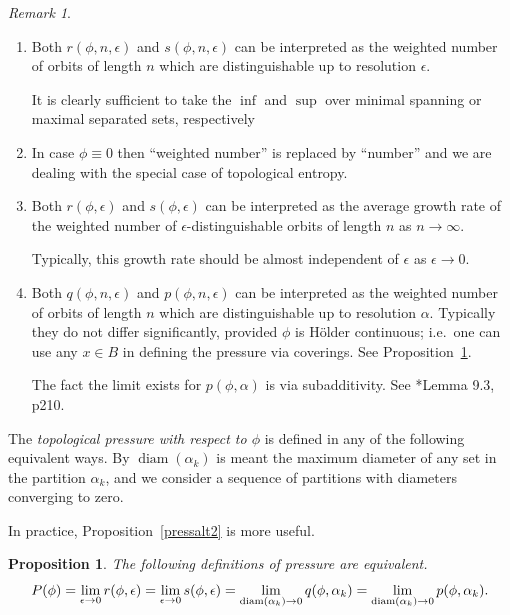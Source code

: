 \documentclass[a4paper]{amsart}
\theoremstyle{plain}
\newtheorem{proposition}[theorem]{Proposition}
\theoremstyle{definition}
\theoremstyle{remark}
\newtheorem{remark}[theorem]{Remark}
\DeclareMathOperator{\diam}{diam}
\begin{document}
\begin{remark}
\mbox{}
\begin{enumerate}

\item Both $ r(\phi, n , \epsilon ) $ and $ s(\phi, n , \epsilon ) $ can be interpreted as  the weighted number of orbits of length $ n $ which are distinguishable up to resolution $ \epsilon$.


It is clearly sufficient to take the $ \inf $ and $ \sup $ over minimal spanning or maximal separated sets, respectively

\item In case $ \phi \equiv 0 $ then ``weighted number'' is replaced by ``number'' and we are dealing with the special case of topological entropy. 

\item Both $ r(\phi,   \epsilon ) $ and $ s(\phi,   \epsilon ) $ can be interpreted as  the average growth rate of the
weighted number of $ \epsilon $-distinguishable orbits of length $ n $ as $ n\to \infty $.

Typically, this growth rate should be almost independent of $ \epsilon $ as $ \epsilon \to 0 $.

\item Both $ q(\phi, n , \epsilon ) $ and $ p(\phi, n , \epsilon ) $ can be interpreted as  the weighted number of orbits of length $ n $ which are distinguishable up to resolution $ \alpha $.  Typically they do not differ significantly, provided $ \phi $ is H\"{o}lder continuous; i.e.\ one can use any $ x\in B $ in defining the pressure via coverings.  See Proposition~\ref{pressalt}.

The fact the limit exists for $ p(\phi,\alpha) $ is via subadditivity.  See \cite{Wal}*{Lemma 9.3, p210}. 
\end{enumerate} 
 \end{remark}  
 
 The  \emph{topological pressure with respect to $ \phi $} is defined in any of the following equivalent ways.  By $ \diam(\alpha_k) $ is meant the maximum diameter of any set in the partition $ \alpha_k $, and we consider a sequence of partitions with diameters converging to zero.
 
 In practice, Proposition~\ref{pressalt2} is more useful.
  \begin{proposition}\label{pressalt}  The following definitions of pressure are equivalent.
\[
P(\phi)  = \lim_{\epsilon \to 0} r(\phi, \epsilon)  = \lim_{\epsilon \to 0} s(\phi, \epsilon)\\
  = \lim_{\diam (\alpha_k)\to 0} q(\phi,\alpha_k) =  \lim_{\diam (\alpha_k)\to 0} p(\phi,\alpha_k).
\]
\end{proposition} 
\end{document}

